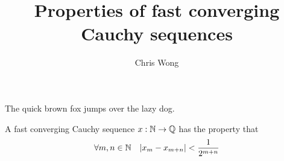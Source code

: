 \documentclass[leqno]{report}
\begin{document}
\author{Chris Wong}
\title{Properties of fast converging Cauchy sequences}
\maketitle

The quick brown fox jumps over the lazy dog.

\begin{Definition}
    A fast converging Cauchy sequence $x : \mathbb{N} \rightarrow \mathbb{Q}$ has the property that
    \[ \forall {m, n \in \mathbb{N}} \quad { \left| x_m - x_{m+n} \right| < \frac{1}{2^{m+n}} } \]
\end{Definition}



\end{document}
